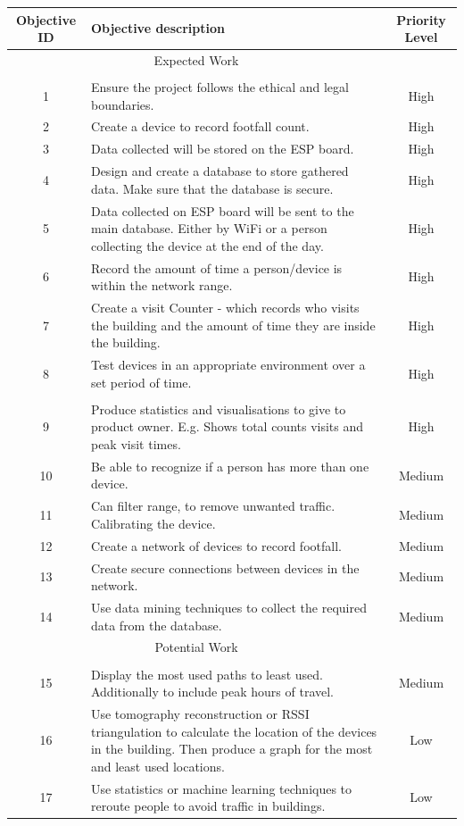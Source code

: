 \documentclass{report}
\begin{document}
\clearpage
\begin{table}[h]
    \centering
    \begin{tabular}{c p{11cm} c}
    \hline
     Objective ID  &  Objective description  & Priority Level\\
    \hline
    \hline
    \multicolumn{2}{c}{Expected Work}\\
     \hline
     \\
       1 & Ensure the project follows the ethical and legal boundaries. &  High \\
       2 & Create a device to record footfall count. & High\\
       3 & Data collected will be stored on the ESP board. & High \\
       4 & Design and create a database to store gathered data. Make sure that the database is secure. & High\\
       5 & Data collected on ESP board will be sent to the main database. Either by WiFi or a person collecting the device at the end of the day. & High \\
       6 & Record the amount of time a person/device is within the network range. & High\\ 
       7 & Create a visit Counter -  which records who visits the building and the amount of time they are inside the building. & High \\ 
       8 & Test devices in an appropriate environment over a set period of time. & High\\ \\
       9 & Produce statistics and visualisations to give to product owner. E.g. Shows total counts visits and peak visit times. & High \\
       10 & Be able to recognize if a person has more than one device. & Medium\\ 
       11 & Can filter range, to remove unwanted traffic. Calibrating the device. & Medium \\
       12 & Create a network of devices to record footfall. & Medium\\
       13 & Create secure connections between devices in the network. & Medium\\ 
       14 & Use data mining techniques to collect the required data from the database.  & Medium\\
       
     \hline
     \multicolumn{2}{c}{Potential Work}\\

     \hline
     \\
     15 & Display the most used paths to least used. Additionally to include peak hours of travel. & Medium\\
     16 & Use tomography reconstruction\cite{tomography} or RSSI\cite{RSSI} triangulation to calculate the location of the devices in the building. Then produce a graph for the most and least used locations. & Low \\ 
     17 & Use statistics or machine learning techniques to reroute people to avoid traffic in buildings.& Low\\ 
     

\end{tabular}
\end{table}
\end{document}
